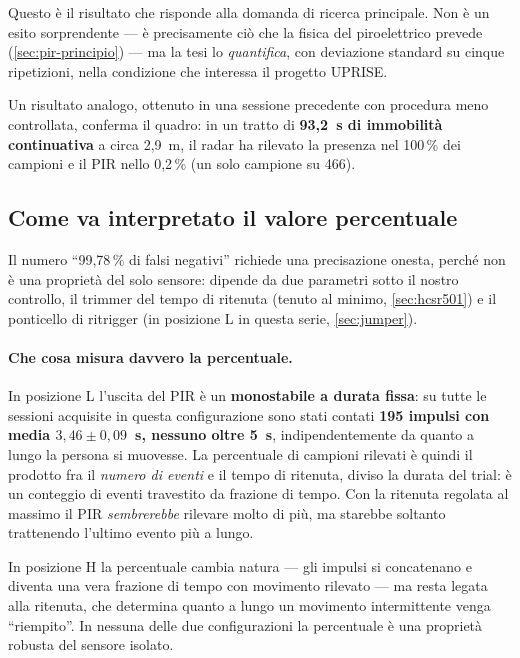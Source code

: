 Questo è il risultato che risponde alla domanda di ricerca principale. Non è un
esito sorprendente --- è precisamente ciò che la fisica del piroelettrico prevede
(\cref{sec:pir-principio}) --- ma la tesi lo \emph{quantifica}, con deviazione
standard su cinque ripetizioni, nella condizione che interessa il progetto UPRISE.

Un risultato analogo, ottenuto in una sessione precedente con procedura meno
controllata, conferma il quadro: in un tratto di \textbf{93,2~s di immobilità
continuativa} a circa 2,9~m, il radar ha rilevato la presenza nel 100\,\% dei
campioni e il PIR nello 0,2\,\% (un solo campione su 466).

\subsection{Come va interpretato il valore percentuale}
\label{sec:interpretazione-pir}

Il numero ``99,78\,\% di falsi negativi'' richiede una precisazione onesta, perché non
è una proprietà del solo sensore: dipende da due parametri sotto il nostro controllo,
il trimmer del tempo di ritenuta (tenuto al minimo, \cref{sec:hcsr501}) e il
ponticello di ritrigger (in posizione L in questa serie, \cref{sec:jumper}).

\paragraph{Che cosa misura davvero la percentuale.} In posizione L l'uscita del PIR è
un \textbf{monostabile a durata fissa}: su tutte le sessioni acquisite in questa
configurazione sono stati contati \textbf{195 impulsi con media $3{,}46 \pm 0{,}09$~s,
nessuno oltre 5~s}, indipendentemente da quanto a lungo la persona si muovesse. La
percentuale di campioni rilevati è quindi il prodotto fra il \emph{numero di eventi} e
il tempo di ritenuta, diviso la durata del trial: è un conteggio di eventi travestito
da frazione di tempo. Con la ritenuta regolata al massimo il PIR
\emph{sembrerebbe} rilevare molto di più, ma starebbe soltanto trattenendo l'ultimo
evento più a lungo.

In posizione H la percentuale cambia natura --- gli impulsi si concatenano e diventa
una vera frazione di tempo con movimento rilevato --- ma resta legata alla ritenuta,
che determina quanto a lungo un movimento intermittente venga ``riempito''. In nessuna
delle due configurazioni la percentuale è una proprietà robusta del sensore isolato.

